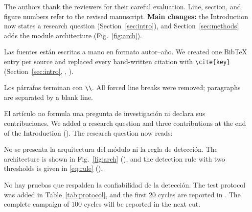 \documentclass{LabDSTresponse}
\begin{document}

The authors thank the reviewers for their careful evaluation. Line,
section, and figure numbers refer to the revised manuscript.
\textbf{Main changes:} the Introduction now states a research question
(Section~\ref{sec:intro}), and Section~\ref{sec:methods} adds the
module architecture (Fig.~\ref{fig:arch}).

\LabDSTsummary


{Las fuentes están escritas a mano en formato autor--año.}
{We created one BibTeX entry per source and replaced every hand-written citation with
\texttt{\textbackslash cite\{key\}} (Section~\ref{sec:intro}, , ).}

{Los párrafos terminan con \texttt{\textbackslash\textbackslash}.}
{All forced line breaks were removed; paragraphs are separated by a blank line.}


{El artículo no formula una pregunta de investigación ni declara sus contribuciones.}
{We added a research question and three contributions at the end of the Introduction
(). The research question now reads:
}


{No se presenta la arquitectura del módulo ni la regla de detección.}
{The architecture is shown in Fig.~\ref{fig:arch} (), and the
detection rule with two thresholds is given in \eqref{eq:rule} ().}

{No hay pruebas que respalden la confiabilidad de la detección.}
{The test protocol was added in Table~\ref{tab:protocol}, and the first 20 cycles are
reported in . The complete campaign of 100 cycles will be
reported in the next cut.}
\end{document}
